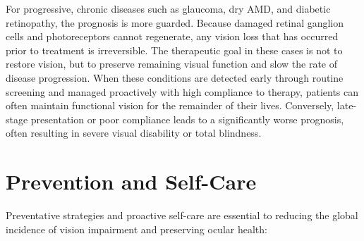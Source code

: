For progressive, chronic diseases such as glaucoma, dry AMD, and diabetic retinopathy, the prognosis is more guarded. Because damaged retinal ganglion cells and photoreceptors cannot regenerate, any vision loss that has occurred prior to treatment is irreversible. The therapeutic goal in these cases is not to restore vision, but to preserve remaining visual function and slow the rate of disease progression. When these conditions are detected early through routine screening and managed proactively with high compliance to therapy, patients can often maintain functional vision for the remainder of their lives. Conversely, late-stage presentation or poor compliance leads to a significantly worse prognosis, often resulting in severe visual disability or total blindness.

\section*{Prevention and Self-Care}
Preventative strategies and proactive self-care are essential to reducing the global incidence of vision impairment and preserving ocular health:

